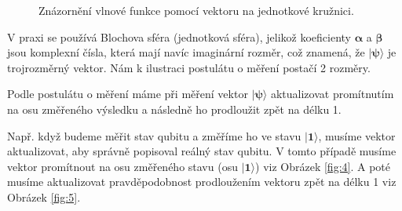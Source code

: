 \begin{figure}[ht]

    \centering

    \caption{\label{fig:3}Znázornění vlnové funkce pomocí vektoru na jednotkové kružnici.}
\end{figure}

V praxi se používá Blochova sféra (jednotková sféra), jelikož koeficienty $\bm{\alpha}$ a $\bm{\beta}$ jsou komplexní čísla, která mají navíc imaginární rozměr, což znamená, že $\bm{|\psi\rangle}$ je trojrozměrný vektor. Nám k ilustraci postulátu o měření postačí 2 rozměry.

Podle postulátu o měření máme při měření vektor $\bm{|\psi\rangle}$ aktualizovat promítnutím na osu změře\-ného výsledku a následně ho prodloužit zpět na délku 1.

Např. když budeme měřit stav qubitu a změříme ho ve stavu $\bm{|1\rangle}$, musíme vektor aktualizovat, aby správně popisoval reálný stav qubitu. V tomto případě musíme vektor promítnout na osu změřeného stavu (osu $\bm{|1\rangle}$) viz Obrázek \ref{fig:4}. A poté musíme aktualizovat pravděpodobnost prodloužením vektoru zpět na délku 1 viz Obrázek \ref{fig:5}.

